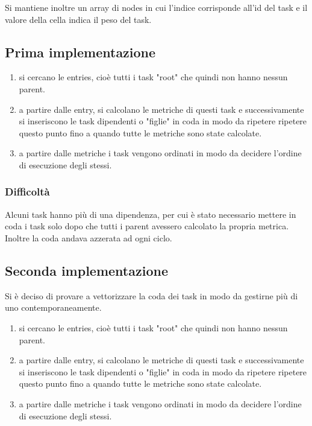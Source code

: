 \documentclass{article}
\begin{document}
            Si mantiene inoltre un array di nodes in cui l'indice corrisponde all'id del task e il valore della cella indica il peso del task.

        \subsection{Prima implementazione}
            \begin{enumerate}
                \item  si cercano le entries, cioè tutti i task "root" che quindi non hanno nessun parent.
                \item a partire dalle entry, si calcolano le metriche di questi task e successivamente si inseriscono le task dipendenti o "figlie" in coda in modo da ripetere ripetere questo punto fino a quando tutte le metriche sono state calcolate.
                \item a partire dalle metriche i task vengono ordinati in modo da decidere l'ordine di esecuzione degli stessi.
            \end{enumerate}
            \subsubsection{Difficoltà}
                Alcuni task hanno più di una dipendenza, per cui è stato necessario mettere in coda i task solo dopo che tutti i parent avessero calcolato la propria metrica.
                Inoltre la coda andava azzerata ad ogni ciclo.

        \subsection{Seconda implementazione}
            Si è deciso di provare a vettorizzare la coda dei task in modo da gestirne più di uno contemporaneamente.
            \begin{enumerate}
                \item  si cercano le entries, cioè tutti i task "root" che quindi non hanno nessun parent.
                \item a partire dalle entry, si calcolano le metriche di questi task e successivamente si inseriscono le task dipendenti o "figlie" in coda in modo da ripetere ripetere questo punto fino a quando tutte le metriche sono state calcolate.
                \item a partire dalle metriche i task vengono ordinati in modo da decidere l'ordine di esecuzione degli stessi.
            \end{enumerate}
\end{document}
